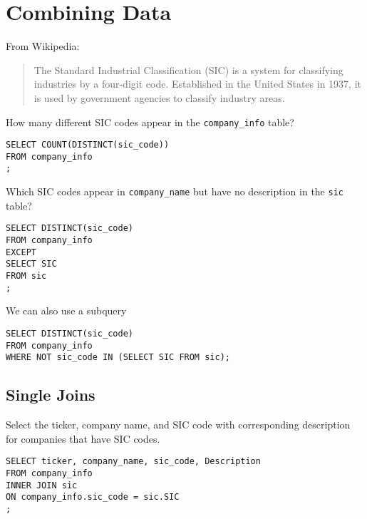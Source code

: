 \documentclass[10pt]{exam}
\begin{document}
\section{Combining Data}

From Wikipedia:

    \begin{quote}
        The Standard Industrial Classification (SIC) is a system for
        classifying industries by a four-digit code. Established in the
        United States in 1937, it is used by government agencies to
        classify industry areas.
    \end{quote}

\begin{questions}

\question How many different SIC codes appear in the \texttt{company\_info}
table?

\begin{solution}
\begin{lstlisting}
SELECT COUNT(DISTINCT(sic_code))
FROM company_info
;
\end{lstlisting}
\end{solution}

    \question Which SIC codes appear in \texttt{company\_name} but have no
    description in the \texttt{sic} table?

\begin{solution}
\begin{lstlisting}
SELECT DISTINCT(sic_code)
FROM company_info
EXCEPT
SELECT SIC
FROM sic
;
\end{lstlisting}

We can also use a subquery
\begin{lstlisting}
SELECT DISTINCT(sic_code)
FROM company_info
WHERE NOT sic_code IN (SELECT SIC FROM sic);
\end{lstlisting}
\end{solution}



\subsection*{Single Joins}

\question Select the ticker, company name, and SIC code with corresponding description for
    companies that have SIC codes.

\begin{solution}
\begin{lstlisting}
SELECT ticker, company_name, sic_code, Description
FROM company_info
INNER JOIN sic
ON company_info.sic_code = sic.SIC
;
\end{lstlisting}
\end{solution}



\end{questions}
\end{document}
